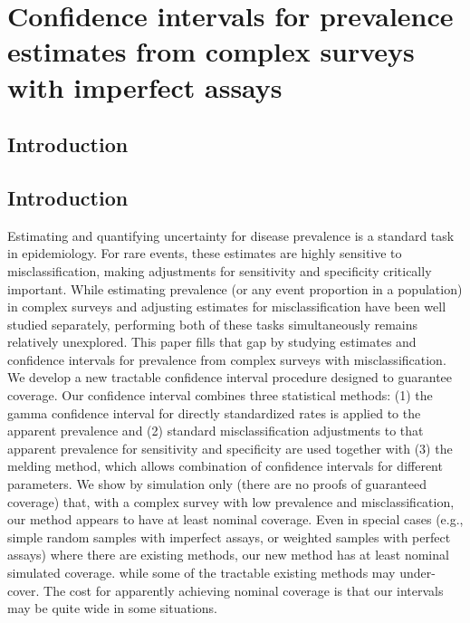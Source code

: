 \chapter{Confidence intervals for prevalence estimates from complex surveys with imperfect assays}
\label{ch:content_1}
\graphicspath{{figures/ch_3/}}
\section{Introduction}

\section{Introduction}

Estimating and quantifying uncertainty for disease prevalence is a standard task in epidemiology.
For rare events, these estimates are highly sensitive to misclassification,\cite{hemenwaySelfDefense} making adjustments for sensitivity and specificity critically important.
While estimating prevalence (or any event proportion in a population) in complex surveys and adjusting estimates for misclassification have been well studied separately, performing both of these tasks simultaneously remains relatively unexplored. This paper fills that gap by studying estimates and confidence intervals for prevalence from complex surveys with misclassification.
We develop a new tractable confidence interval procedure designed to guarantee coverage.
Our confidence interval combines three statistical methods: (1) the gamma confidence interval for directly standardized rates is applied to the apparent prevalence\cite{FayF:1997}
and (2) standard misclassification adjustments to that apparent prevalence for sensitivity and specificity \cite{Roga:1978} are used together with (3) the melding method, which allows combination of confidence intervals for different parameters.\cite{FayP:2015}
We show by simulation only (there are no proofs of guaranteed coverage) that, with a complex survey with low prevalence and misclassification, our method appears to have at least nominal coverage.
Even in special cases (e.g., simple random samples with imperfect assays, or weighted samples with perfect assays) where there are existing methods, our new method has at least nominal simulated coverage. while some of the tractable existing methods may under-cover.
The cost for apparently achieving nominal coverage is that our intervals may be quite wide in some situations.


